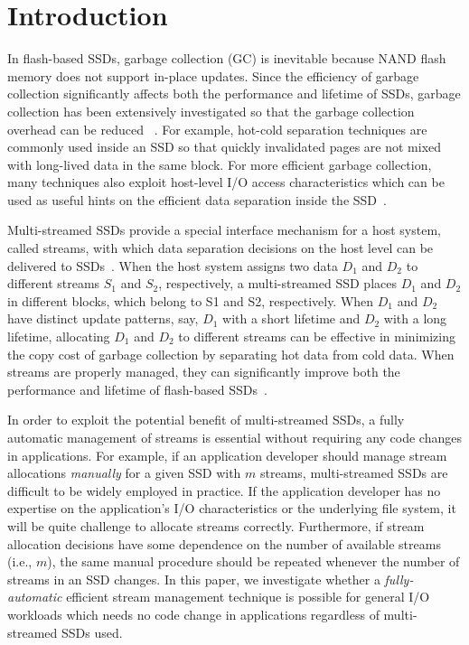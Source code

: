\section{Introduction}
\label{sec:intro}
In flash-based SSDs, garbage collection (GC) is inevitable because NAND flash 
memory does not support in-place updates.  
Since the efficiency of garbage collection significantly affects  
both the performance and lifetime of SSDs, garbage collection has been extensively 
investigated so that the garbage collection overhead can be reduced
~\cite{GCGreedy, GCVictim, GCTTFlash, HotCold}.  
For example, hot-cold separation techniques are commonly used inside an SSD 
so that quickly invalidated pages are not mixed with long-lived data in the same block.   
For more efficient garbage collection, many techniques also exploit
host-level I/O access characteristics which can be used as useful hints on 
the efficient data separation inside the SSD~\cite{JiTGC, ShadowGC}.

Multi-streamed SSDs provide a special interface mechanism for 
a host system, called streams,  with which data separation decisions 
on the host level can be delivered to SSDs~\cite{T10, MultiStream}.  
When the host system assigns two data $D_1$ and $D_2$ to 
different streams $S_1$ and $S_2$, respectively, a multi-streamed SSD 
places $D_1$ and $D_2$ in different blocks, which belong to S1 and S2, respectively.
When $D_1$ and $D_2$ have distinct update patterns, say, $D_1$ with a short lifetime 
and $D_2$ with a long lifetime, allocating $D_1$ and $D_2$ to different streams 
can be effective in minimizing the copy cost of
garbage collection by separating hot data from cold data.  
When streams are properly managed, they can significantly
improve both the performance and lifetime of 
flash-based SSDs~\cite{MultiStream, Level, FStream, vStream, AutoStream}.

In order to exploit the potential benefit of multi-streamed SSDs, 
a fully automatic management of streams is essential without requiring any 
code changes in applications.  For example, if an
application developer should manage stream allocations {\it manually} for 
a given SSD with $m$ streams, multi-streamed SSDs are difficult to be 
widely employed in practice.   If the application
developer has no expertise on the application's I/O characteristics or 
the underlying file system, it will be quite challenge to allocate streams correctly.   
Furthermore, if stream allocation decisions have some dependence on
the number of available streams (i.e., $m$),  
the same manual procedure should be repeated whenever the number of streams in an SSD changes.
In this paper, we investigate whether a  
{\it fully-automatic} efficient stream management technique is possible
for general I/O workloads which 
needs no code change in applications regardless of multi-streamed SSDs used.

